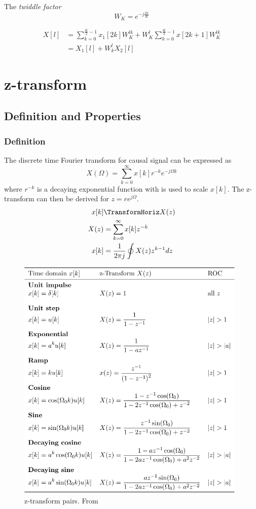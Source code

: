 The \textit{twiddle factor}
\begin{equation*}
    W_K = e^{-j\frac{2\pi}{K}}
\end{equation*}

\begin{align*}
    X[l] &= \sum_{k=0}^{\frac{K}{2}-1}x_1[2k]W_K^{lk} + W_K^{l} \sum_{k=0}^{\frac{K}{2}-1}x[2k+1]W_K^{lk}  \\
    &= X_1[l] + W_k^l X_2[l]
\end{align*}


\section{z-transform}
\subsection{Definition and Properties}
\subsubsection{Definition}
The discrete time Fourier transform for causal signal can be expressed as
\begin{equation*}
    X(\Omega) = \sum_{k=0}^{\infty}x[k]r^{-k}e^{-j\Omega k}
\end{equation*}
where $r^{-k}$ is a decaying exponential function with is used to scale $x[k]$.
The z-transform can then be derived for $z=re^{j\Omega}$.
\begin{align*}
    x[k] &\TransformHoriz X(z) \\
    X(z) &= \sum_{k=0}^{\infty} x[k]z^{-k} \\
    x[k] &= \frac{1}{2\pi j} \oint X(z)z^{k-1}dz
\end{align*}

\begin{figure}[H]
    \centering
    \includegraphics[width=11cm]{image/z-transform_pairs.png}
    \caption{z-transform pairs. From \cite{st}}
    \label{fig:z-transform_pairs}
\end{figure}


